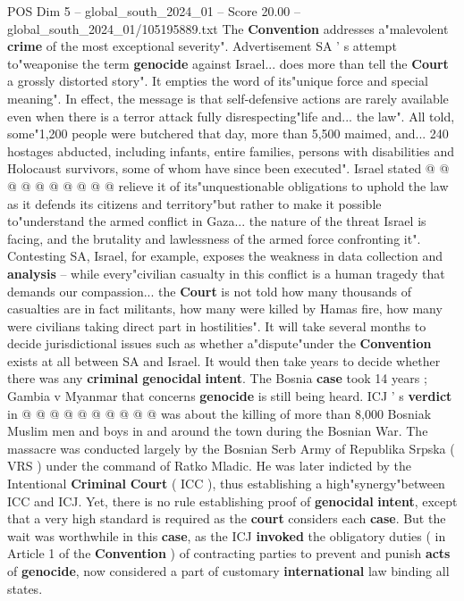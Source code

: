 \begin{textsample}{POS Dim 5 – global\_south\_2024\_01 – Score 20.00 – global\_south\_2024\_01/105195889.txt}
The \textbf{Convention} addresses a"malevolent \textbf{crime} of the most exceptional severity".
Advertisement SA ' s attempt to"weaponise the term \textbf{genocide} against Israel... does more than tell the \textbf{Court} a grossly distorted story".
It empties the word of its"unique force and special meaning".
In effect, the message is that self-defensive actions are rarely available even when there is a terror attack fully disrespecting"life and... the law".
All told, some"1,200 people were butchered that day, more than 5,500 maimed, and... 240 hostages abducted, including infants, entire families, persons with disabilities and Holocaust survivors, some of whom have since been executed".
Israel stated @ @ @ @ @ @ @ @ @ @ relieve it of its"unquestionable obligations to uphold the law as it defends its citizens and territory"but rather to make it possible to"understand the armed conflict in Gaza... the nature of the threat Israel is facing, and the brutality and lawlessness of the armed force confronting it".
Contesting SA, Israel, for example, exposes the weakness in data collection and \textbf{analysis} -- while every"civilian casualty in this conflict is a human tragedy that demands our compassion... the \textbf{Court} is not told how many thousands of casualties are in fact militants, how many were killed by Hamas fire, how many were civilians taking direct part in hostilities".
It will take several months to decide jurisdictional issues such as whether a"dispute"under the \textbf{Convention} exists at all between SA and Israel.
It would then take years to decide whether there was any \textbf{criminal} \textbf{genocidal} \textbf{intent}.
The Bosnia \textbf{case} took 14 years ; Gambia v Myanmar that concerns \textbf{genocide} is still being heard.
ICJ ' s \textbf{verdict} in @ @ @ @ @ @ @ @ @ @ was about the killing of more than 8,000 Bosniak Muslim men and boys in and around the town during the Bosnian War.
The massacre was conducted largely by the Bosnian Serb Army of Republika Srpska ( VRS ) under the command of Ratko Mladic.
He was later indicted by the Intentional \textbf{Criminal} \textbf{Court} ( ICC ), thus establishing a high"synergy"between ICC and ICJ.
Yet, there is no rule establishing proof of \textbf{genocidal} \textbf{intent}, except that a very high standard is required as the \textbf{court} considers each \textbf{case}.
But the wait was worthwhile in this \textbf{case}, as the ICJ \textbf{invoked} the obligatory duties ( in Article 1 of the \textbf{Convention} ) of contracting parties to prevent and punish \textbf{acts} of \textbf{genocide}, now considered a part of customary \textbf{international} law binding all states.

\end{textsample}
